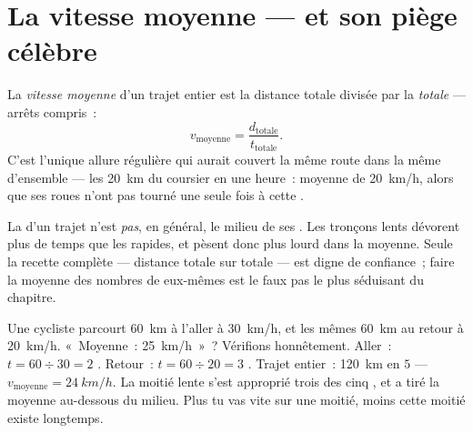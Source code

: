 \section{La vitesse moyenne --- et son piège célèbre}

\begin{definition}\label{def:g7:motion-average-speed:average}
La \emph{vitesse moyenne} d'un trajet entier
est la distance totale divisée par la  \emph{totale} --- arrêts
compris~:
\[
v_{\text{moyenne}} = \frac{d_{\text{totale}}}{t_{\text{totale}}}.
\]
C'est l'unique allure régulière qui aurait couvert la même route dans
la même  d'ensemble --- les \qty{20}{km} du coursier en une
heure~: moyenne de \qty{20}{km/h}, alors que ses roues n'ont pas
tourné une seule fois à cette .
\end{definition}

\begin{proposition}[Le piège]\label{prop:g7:motion-average-speed:trap}
La  d'un trajet n'est \emph{pas}, en général, le
milieu de ses . Les tronçons lents dévorent plus de temps que
les rapides, et pèsent donc plus lourd dans la moyenne. Seule la
recette complète --- distance totale sur  totale --- est digne
de confiance~; faire la moyenne des nombres de  eux-mêmes est
le faux pas le plus séduisant du chapitre.
\end{proposition}

\begin{example}\label{ex:g7:motion-average-speed:sprung}
Une cycliste parcourt \qty{60}{km} à l'aller à \qty{30}{km/h}, et les
mêmes \qty{60}{km} au retour à \qty{20}{km/h}. «~Moyenne~:
\qty{25}{km/h}~»~? Vérifions honnêtement. Aller~:
$t = 60 \div 30 = 2$ . Retour~: $t = 60 \div 20 = 3$ .
Trajet entier~: \qty{120}{km} en $5$  ---
$v_{\text{moyenne}} = \qty{24}{km/h}$. La moitié lente s'est
approprié trois des cinq , et a tiré la moyenne au-dessous du
milieu. Plus tu vas vite sur une moitié, moins cette moitié existe
longtemps.
\end{example}

